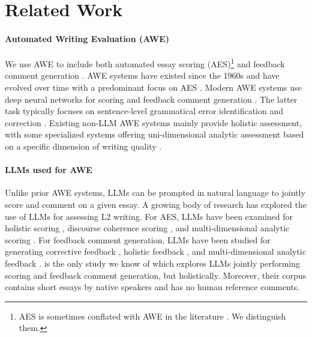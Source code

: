 \section{Related Work\label{sec:relatedWork}}

\paragraph{Automated Writing Evaluation (AWE)} We use AWE to include both automated essay scoring (AES)\footnote{AES is sometimes conflated with AWE in the literature \citep{Hockly2019}. We distinguish them.} and feedback comment generation \citep{Shermis2013-ja}. AWE systems have existed since the 1960s \citep{page1966imminence} and have evolved over time with a predominant focus on AES \citep{Ke2019, Hussein2019, Zhang2020, Uto2021, Lagakis2021}. Modern AWE systems use deep neural networks for scoring \citep{taghipour-ng-2016-neural, alikaniotis-etal-2016-automatic, dong-etal-2017-attention, rodriguez2019languagemodelsautomatedessay, yang-etal-2020-enhancing, xie-etal-2022-automated} and feedback comment generation \citep{nagata-2019-toward, han-etal-2019-level, babakov-etal-2023-error}. The latter task typically focuses on sentence-level grammatical error identification and correction \citep{behzad-etal-2024-leaf}. Existing non-LLM AWE systems mainly provide holistic assessment, with some specialized systems offering uni-dimensional analytic assessment based on a specific dimension of writing quality \citep{Ke2019, jong2023reviewfeedbackautomatedessay, banno-etal-2024-gpt}. 


\paragraph{LLMs used for AWE} Unlike prior AWE systems, LLMs can be prompted in natural language to jointly score and comment on a given essay. A growing body of research has explored the use of LLMs for assessing L2 writing. For AES, LLMs have been examined for holistic scoring \citep{MIZUMOTO2023100050, yancey-etal-2023-rating, Wang2024}, discourse coherence scoring \citep{naismith-etal-2023-automated}, and multi-dimensional analytic scoring \citep{Yavuz2024, banno-etal-2024-gpt}. For feedback comment generation, LLMs have been studied for generating corrective feedback \citep{MIZUMOTO2024100116, song-etal-2024-gee}, holistic feedback \citep{behzad-etal-2024-assessing, behzad-etal-2024-leaf}, and multi-dimensional analytic feedback \citep{Guo2024-eg, behzad-etal-2024-assessing, han-etal-2024-llm}. \citet{stahl-etal-2024-exploring} is the only study we know of which explores LLMs jointly performing scoring and feedback comment generation, but holistically. Moreover, their corpus contains short essays by native speakers and has no human reference comments.  

